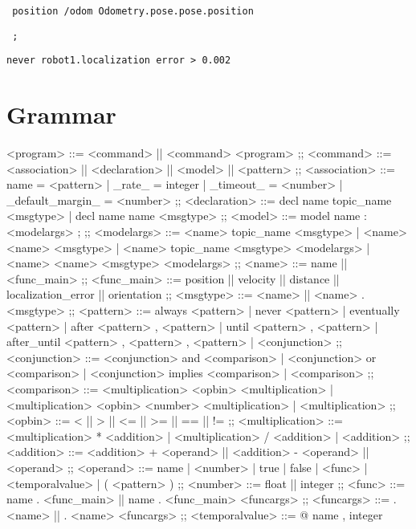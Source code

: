 \texttt{    position /odom Odometry.pose.pose.position}

\texttt{    ;}

\texttt{never robot1.localization error > 0.002}


\section{Grammar}
\label{sec:grammar}

\begin{bnfgrammar}
    <program> %
    ::=
    <command> || <command> <program>
    ;;
    <command> ::=
    <association>
    || <declaration>
    || <model>
    || <pattern>
    ;; 
    <association> ::=
    name = <pattern>
    | \_rate\_ = integer
    | \_timeout\_ = <number>
    | \_default\_margin\_ = <number>
    ;;
    <declaration> ::=
    decl name topic\_name <msgtype>
    | decl name name <msgtype>
    ;;
    <model> ::= 
    model name $\colon$ <modelargs> ;
    ;;
    <modelargs> ::= 
    <name> topic\_name <msgtype>
    | <name> <name> <msgtype>
    | <name> topic\_name <msgtype> <modelargs>
    | <name> <name> <msgtype> <modelargs>
    ;;
    <name> ::= 
    name || <func\_main>
    ;;
    <func\_main> ::= 
    position
    || velocity
    || distance
    || localization\_error
    || orientation
    ;;
    <msgtype> ::= 
    <name> || <name> . <msgtype>
    ;;
    <pattern> ::= 
    always <pattern>
    | never <pattern>
    | eventually <pattern>
    | after <pattern> , <pattern>
    | until <pattern> , <pattern>
    | after\_until <pattern> , <pattern> , <pattern>
    | <conjunction>
    ;;
    <conjunction> ::= 
    <conjunction> and <comparison>
    | <conjunction> or <comparison>
    | <conjunction> implies <comparison>
    | <comparison>
    ;;
    <comparison> ::= 
    <multiplication> <opbin> <multiplication>
    | <multiplication> <opbin> { <number> } <multiplication>
    | <multiplication>
    ;;
    <opbin> ::= 
    < || > || <= || >= || == || !=
    ;;
    <multiplication> ::= 
    <multiplication> * <addition>
    | <multiplication> / <addition>
    | <addition>
    ;;
    <addition> ::= <addition> + <operand>
    || <addition> - <operand>
    || <operand>
    ;;
    <operand> ::= 
    name | <number> | true | false | <func> | <temporalvalue> | ( <pattern> )
    ;;
    <number> ::= 
    float || integer
    ;;
    <func> ::= 
    name . <func\_main>
    || name . <func\_main> <funcargs>
    ;;
    <funcargs> ::= 
    . <name> || . <name> <funcargs>
    ;;
    <temporalvalue> ::= 
    @ { name , integer }
\end{bnfgrammar}


